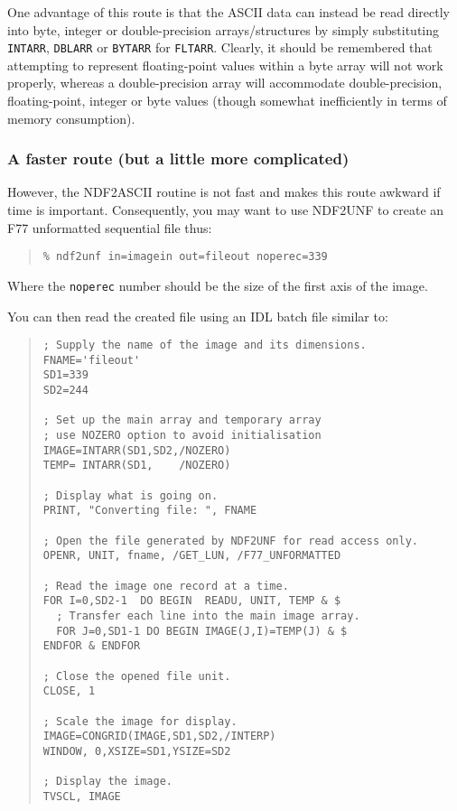 \documentclass[twoside,11pt]{article}
\newcommand{\htmlref}[2]{#1}
\begin{document}
One advantage of this route is that the ASCII data can instead be read
directly into byte, integer or double-precision arrays/structures by 
simply substituting \texttt{INTARR}, \texttt{DBLARR} or \texttt{BYTARR} for 
\texttt{FLTARR}. Clearly, it should be remembered that attempting to represent 
floating-point values 
within a byte array will not work properly, whereas a double-precision 
array will accommodate double-precision, floating-point, integer or byte 
values (though somewhat inefficiently in terms of memory consumption).


\subsubsection{A faster route (but a little more complicated)}
However, the NDF2ASCII routine is not fast and makes this route awkward
if time is important. Consequently, you may want to use
\htmlref{NDF2UNF}{NDF2UNF} to create an F77 unformatted sequential file thus:

\begin{quote} \begin{verbatim}
% ndf2unf in=imagein out=fileout noperec=339
\end{verbatim} \end{quote}
Where the \texttt{noperec} number should be the size of the first axis of
the image.  

You can then read the created file using an IDL batch file similar to:

\begin{quote} \begin{verbatim}
; Supply the name of the image and its dimensions.
FNAME='fileout'
SD1=339
SD2=244
  
; Set up the main array and temporary array
; use NOZERO option to avoid initialisation 
IMAGE=INTARR(SD1,SD2,/NOZERO)
TEMP= INTARR(SD1,    /NOZERO)
 
; Display what is going on.
PRINT, "Converting file: ", FNAME
 
; Open the file generated by NDF2UNF for read access only.
OPENR, UNIT, fname, /GET_LUN, /F77_UNFORMATTED
 
; Read the image one record at a time.
FOR I=0,SD2-1  DO BEGIN  READU, UNIT, TEMP & $
  ; Transfer each line into the main image array.
  FOR J=0,SD1-1 DO BEGIN IMAGE(J,I)=TEMP(J) & $ 
ENDFOR & ENDFOR 
 
; Close the opened file unit.
CLOSE, 1
 
; Scale the image for display.
IMAGE=CONGRID(IMAGE,SD1,SD2,/INTERP)
WINDOW, 0,XSIZE=SD1,YSIZE=SD2
 
; Display the image.
TVSCL, IMAGE
\end{verbatim} \end{quote} 
\end{document}
